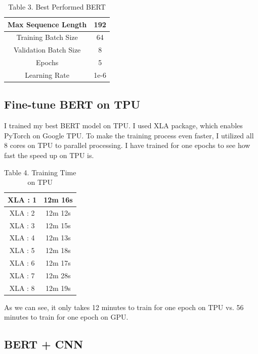 \documentclass[11pt,a4paper]{article}
\begin{document}
\begin{table}[!htbp]
	\centering
	\begin{tabular}{|c|c|}
		\hline
		{Max Sequence Length}   & 192  \\ \hline
		{Training Batch Size}   & 64   \\ \hline
		{Validation Batch Size} & 8    \\ \hline
		{Epochs}                & 5    \\ \hline
		{Learning Rate}         & 1e-6 \\ \hline
	\end{tabular}
	\caption{Table 3. Best Performed BERT}
\end{table}


\subsection{Fine-tune BERT on TPU}

I trained my best BERT model on TPU. I used XLA package, which enables PyTorch on Google TPU. To make the training process even faster, I utilized all 8 cores on TPU to parallel processing. I have trained for one epochs to see how fast the speed up on TPU is.\\

\begin{table}[]
	\centering
	\begin{tabular}{|c|c|}
		\hline
		{XLA : 1} & 12m 16s \\ \hline
		{XLA : 2} & 12m 12s \\ \hline
		{XLA : 3} & 12m 15s \\ \hline
		{XLA : 4} & 12m 13s \\ \hline
		{XLA : 5} & 12m 18s \\ \hline
		{XLA : 6} & 12m 17s \\ \hline
		{XLA : 7} & 12m 28s \\ \hline
		{XLA : 8} & 12m 19s \\ \hline
	\end{tabular}
	\caption{Table 4. Training Time on TPU}
\end{table}

\noindent As we can see, it only takes 12 minutes to train for one epoch on TPU vs. 56 minutes to train for one epoch on GPU.\\

\subsection{BERT + CNN}
\end{document}
